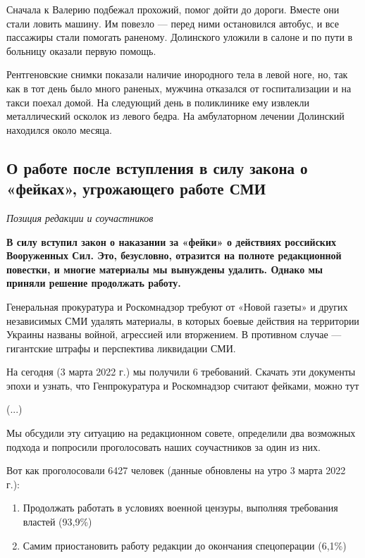 Сначала к Валерию подбежал прохожий, помог дойти до дороги. Вместе они стали ловить машину. Им повезло — перед ними остановился автобус, и все пассажиры стали помогать раненому. Долинского уложили в салоне и по пути в больницу оказали первую помощь.

Рентгеновские снимки показали наличие инородного тела в левой ноге, но, так как в тот день было много раненых, мужчина отказался от госпитализации и на такси поехал домой. На следующий день в поликлинике ему извлекли металлический осколок из левого бедра. На амбулаторном лечении Долинский находился около месяца.

\subsection{О работе после вступления в силу закона о «фейках», угрожающего работе СМИ}
\textit{Позиция редакции и соучастников}

\begin{center}
    \Large \bf В силу вступил закон о наказании за «фейки» о действиях российских Вооруженных Сил. Это, безусловно, отразится на полноте редакционной повестки, и многие материалы мы вынуждены удалить. Однако мы приняли решение продолжать работу.
\end{center}


Генеральная прокуратура и Роскомнадзор требуют от «Новой газеты» и других независимых СМИ удалять материалы, в которых боевые действия на территории Украины названы войной, агрессией или вторжением. В противном случае — гигантские штрафы и перспектива ликвидации СМИ.

На сегодня (3 марта 2022 г.) мы получили 6 требований. Скачать эти документы эпохи и узнать, что Генпрокуратура и Роскомнадзор считают фейками, можно тут

(...)

Мы обсудили эту ситуацию на редакционном совете, определили два возможных подхода и попросили проголосовать наших соучастников за один из них.

Вот как проголосовали 6427 человек (данные обновлены на утро 3 марта 2022 г.):

\begin{enumerate}
    \item Продолжать работать в условиях военной цензуры, выполняя требования властей (93,9\%)
    \item Самим приостановить работу редакции до окончания спецоперации (6,1\%)
\end{enumerate}

